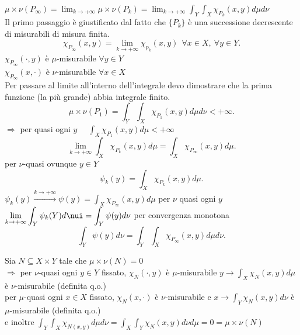 \documentclass[12px]{article}
\begin{document}
\begin{dimo}
	$\displaystyle\mu\times\nu(P_\infty) = \lim_{ k \rightarrow +\infty}\mu\times\nu (P_k) = \lim_{k \rightarrow +\infty}\int_Y\int_X\chi_{P_k}(x,y)d\mu d\nu$\\
	Il primo passaggio è giustificato dal fatto che $\{P_k\}$ è una successione decrescente di misurabili di misura finita.\\
	 \[
		 \chi_{P_\infty}(x,y)  = \lim_{k \rightarrow +\infty} \chi_{p_k}(x,y)\ \ \forall x\in X, \ \forall y\in Y
	 .\] 
	 $\chi_{P_\infty}(\cdot, y)$ è  $\mu$-misurabile $\forall y\in Y$ \\
	 $\chi_{P_\infty}(x,\cdot)$ è  $\nu$-misurabile $\forall x\in X$\\
 Per passare al limite all'interno dell'integrale devo dimostrare che la prima funzione (la più grande) abbia integrale finito.\\
  \[
	  \mu\times\nu(P_1) = \int_Y\int_X\chi_{P_1}(x,y)d\mu d\nu < +\infty
 .\] 
 $ \Rightarrow  $ per quasi ogni $y$ \ \ $\displaystyle\int_X\chi_{P_1}(x,y)d\mu < +\infty$ \\
 \[
	 \lim_{k \rightarrow +\infty}\int_X\chi_{P_k}(x,y)d\mu = \int_X\chi_{P_\infty}(x,y)d\mu
 .\] 
 per $\nu$-quasi ovunque $y\in Y$ \\
 \[
	 \psi_k(y) = \int_X\chi_{P_k}(x,y)d\mu
 .\] 
 $\psi_k(y) \xrightarrow{k \rightarrow +\infty} \psi(y) = \int_X \chi_{P_\infty}(x,y)d\mu$  per $\nu$ quasi ogni  $y$ \\
 $\displaystyle\lim_{k \rightarrow +\infty}\int_Y \psi_k(Y)d\nui = \int_Y\psi(y)d\nu\hfill $ per convergenza monotona
 \[
	 \int_Y\psi(y)d\nu =\int_Y\int_X \chi_{P_\infty}(x,y)d\mu d\nu
 .\] 
\end{dimo}
\begin{lemm}
	Sia $N\subseteq X\times Y$ tale che  $\mu\times\nu (N) = 0$\\
	 $ \Rightarrow $ per $\nu$-quasi ogni  $y\in Y$ fissato,  $\chi_N(\cdot, y)$ è  $\mu$-misurabile $y \rightarrow\int_X\chi_N(x,y)d\mu$ è $\nu$-misurabile (definita q.o.)\\
	 per $\mu$-quasi ogni $x\in X$ fissato,  $\chi_N(x,\cdot)$ è $\nu$-misurabile e $x \rightarrow \int_Y \chi_N (x,y)d\nu$  è $\mu$-misurabile (definita q.o.)\\
	 e inoltre $\int_Y\int_X\chi_{N(x,y)}d\mu d\nu = \int_X\int_Y\chi_N (x,y) d\nu d\mu = 0 = \mu\times\nu(N)$
 \end{lemm}
\end{document}
